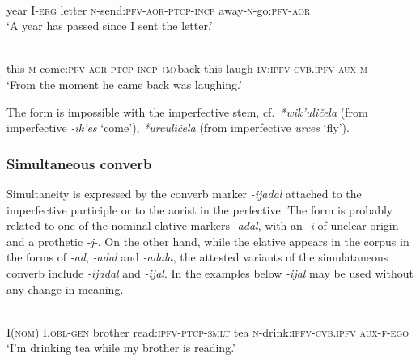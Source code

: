 ﻿\documentclass[output=paper]{langsci/langscibook}
\begin{document}

\ea \label{ex:8:12} %
\\
year I-\textsc{erg} letter \textsc{n}-send:\textsc{pfv}-\textsc{aor}-\textsc{ptcp}-\textsc{incp} away-\textsc{n}-go:\textsc{pfv}-\textsc{aor}\\
\glt `A year has passed since I sent the letter.'

\ex \label{ex:8:13} %
\\
this \textsc{m}-come:\textsc{pfv}-\textsc{aor}-\textsc{ptcp}-\textsc{incp} ‹\textsc{m}›back this laugh-\textsc{lv}:\textsc{ipfv}-\textsc{cvb.ipfv} \textsc{aux}-\textsc{m}\\
\glt `From the moment he came back was laughing.'
\z

The form is impossible with the imperfective stem, cf.\
\emph{*wik'uličela} (from imperfective \emph{-ik'es} `come'),
\emph{*urculičela} (from imperfective \emph{urces} `fly').

\subsubsection{Simultaneous converb}

Simultaneity is expressed by the converb marker \emph{-ijadal} attached
to the imperfective participle or to the aorist in the perfective. The
form is probably related to one of the nominal elative markers
\emph{-adal}, with an \emph{-i} of unclear origin and a prothetic
\emph{-j}-. On the other hand, while the elative appears in the corpus in the forms of \emph{-ad}, 
\emph{-adal} and \emph{-adala},
the attested variants of the simulataneous converb include \emph{-ijadal} and \emph{-ijal}.
In the examples below \emph{-ijal} may be used without any change in meaning.

\ea \label{ex:8:14} %
\\
I(\textsc{nom}) I.\textsc{obl}-\textsc{gen} brother read:\textsc{ipfv}-\textsc{ptcp}-\textsc{smlt} tea \textsc{n}-drink:\textsc{ipfv}-\textsc{cvb.ipfv} \textsc{aux}-\textsc{f}-\textsc{ego}\\
\glt `I'm drinking tea while my brother is reading.'
\end{document}
